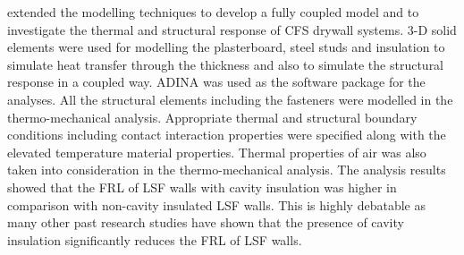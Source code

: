 \citet{Thanasoulas2018} extended the modelling techniques to develop a fully coupled model and to investigate the thermal and structural response of CFS drywall systems. 3-D solid elements were used for modelling the plasterboard, steel studs and insulation to simulate heat transfer through the thickness and also to simulate the structural response in a coupled way. ADINA was used as the software package for the analyses. All the structural elements including the fasteners were modelled in the thermo-mechanical analysis. Appropriate thermal and structural boundary conditions including contact interaction properties were specified along with the elevated temperature material properties. Thermal properties of air was also taken into consideration in the thermo-mechanical analysis. The analysis results showed that the FRL of LSF walls with cavity insulation was higher in comparison with non-cavity insulated LSF walls. This is highly debatable as many other past research studies have shown that the presence of cavity insulation significantly reduces the FRL of LSF walls. 

